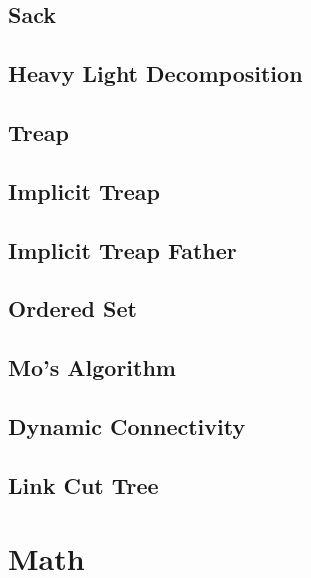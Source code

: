 \subsection{Sack}
\raggedbottom
\hrulefill
\subsection{Heavy Light Decomposition}
\raggedbottom
\hrulefill
\subsection{Treap}
\raggedbottom
\hrulefill
\subsection{Implicit Treap}
\raggedbottom
\hrulefill
\subsection{Implicit Treap Father}
\raggedbottom
\hrulefill
\subsection{Ordered Set}
\raggedbottom
\hrulefill
\subsection{Mo's Algorithm}
\raggedbottom
\hrulefill
\subsection{Dynamic Connectivity}
\raggedbottom
\hrulefill
\subsection{Link Cut Tree}
\raggedbottom
\hrulefill

\section{Math}
